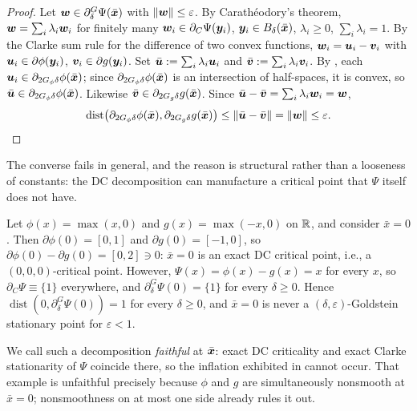 \begin{proof}
Let $\bm{w}\in\partial_\delta^G\Psi(\bar{\bm{x}})$ with $\|\bm{w}\|\le\varepsilon$. By
Carath\'eodory's theorem, $\bm{w}=\sum_i\lambda_i\bm{w}_i$ for finitely many
$\bm{w}_i\in\partial_C\Psi(\bm{y}_i)$, $\bm{y}_i\in B_\delta(\bar{\bm{x}})$,
$\lambda_i\ge0$, $\sum_i\lambda_i=1$. By the Clarke sum rule for the
difference of two convex functions, $\bm{w}_i=\bm{u}_i-\bm{v}_i$ with
$\bm{u}_i\in\partial\phi(\bm{y}_i)$, $\bm{v}_i\in\partial g(\bm{y}_i)$. Set
$\bar{\bm{u}}:=\sum_i\lambda_i\bm{u}_i$ and $\bar{\bm{v}}:=\sum_i\lambda_i\bm{v}_i$. By
, each $\bm{u}_i\in\partial_{2G_\phi\delta}\phi(\bar{\bm{x}})$;
since $\partial_{2G_\phi\delta}\phi(\bar{\bm{x}})$ is an intersection of
half-spaces, it is convex, so $\bar{\bm{u}}\in\partial_{2G_\phi\delta}\phi(\bar{\bm{x}})$.
Likewise $\bar{\bm{v}}\in\partial_{2G_g\delta}g(\bar{\bm{x}})$. Since
$\bar{\bm{u}}-\bar{\bm{v}}=\sum_i\lambda_i\bm{w}_i=\bm{w}$,
\[
    \operatorname{dist}\bigl(\partial_{2G_\phi\delta}\phi(\bar{\bm{x}}),\partial_{2G_g\delta}g(\bar{\bm{x}})\bigr)
    \le\|\bar{\bm{u}}-\bar{\bm{v}}\|=\|\bm{w}\|\le\varepsilon.
    \qedhere
\]
\end{proof}

The converse fails in general, and the reason is structural rather than a
looseness of constants: the DC decomposition can manufacture a critical
point that $\Psi$ itself does not have.

\begin{example}
\label{ex:goldstein-counterexample}
Let $\phi(x)=\max\limits(x,0)$ and $g(x)=\max\limits(-x,0)$ on $\mathbb{R}$, and consider
$\bar x=0$. Then $\partial\phi(0)=[0,1]$ and $\partial g(0)=[-1,0]$, so
$\partial\phi(0)-\partial g(0)=[0,2]\ni0$: $\bar x=0$ is an exact DC
critical point, i.e., a $(0,0,0)$-critical point. However,
$\Psi(x)=\phi(x)-g(x)=x$ for every $x$, so $\partial_C\Psi\equiv\{1\}$
everywhere, and $\partial_\delta^G\Psi(0)=\{1\}$ for every $\delta\ge0$.
Hence $\operatorname{dist}(0,\partial_\delta^G\Psi(0))=1$ for every
$\delta\ge0$, and $\bar x=0$ is never a $(\delta,\varepsilon)$-Goldstein
stationary point for $\varepsilon<1$.
\end{example}

\begin{remark}
\label{rem:faithful-decomposition}
 We call such a
decomposition \emph{faithful} at $\bar{\bm{x}}$: exact DC criticality and exact
Clarke stationarity of $\Psi$ coincide there, so the inflation exhibited in
 cannot occur. That example is unfaithful
precisely because $\phi$ and $g$ are simultaneously nonsmooth at
$\bar x=0$; nonsmoothness on at most one side already rules it out.
\end{remark}

